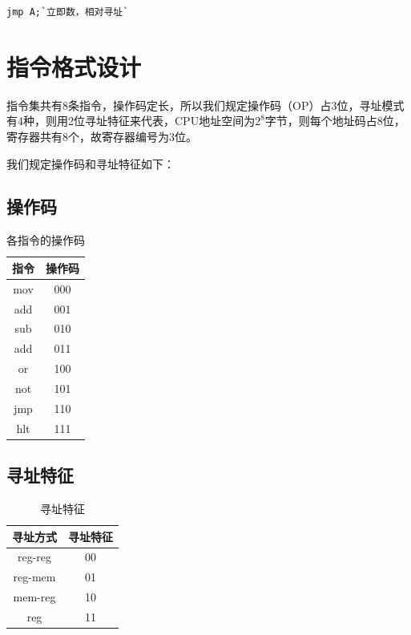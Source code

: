 \documentclass[UTF8]{ctexrep}
\begin{document}
\begin{lstlisting}[language={[x86masm]Assembler}]
jmp A;`立即数，相对寻址`
\end{lstlisting}

\chapter{指令格式设计}

指令集共有8条指令，操作码定长，所以我们规定操作码（OP）占3位，寻址模式有4种，则用2位寻址特征来代表，CPU地址空间为$2^8$字节，则每个地址码占8位，寄存器共有8个，故寄存器编号为3位。

我们规定操作码和寻址特征如下：

\section{操作码}

\begin{table}[H]
\centering
\begin{tabular}{|c|c|}
\hline
指令  & 操作码 \\ \hline
mov & 000 \\ \hline
add & 001 \\ \hline
sub & 010 \\ \hline
add & 011 \\ \hline
or  & 100 \\ \hline
not & 101 \\ \hline
jmp & 110 \\ \hline
hlt & 111 \\ \hline
\end{tabular}
\caption{各指令的操作码}
\label{tab:1}
\end{table}

\section{寻址特征}

\begin{table}[H]
\centering
\begin{tabular}{|c|c|}
\hline
寻址方式    & 寻址特征 \\ \hline
reg-reg & 00   \\ \hline
reg-mem & 01   \\ \hline
mem-reg & 10   \\ \hline
reg     & 11   \\ \hline
\end{tabular}
\caption{寻址特征}
\label{tab:2}
\end{table}
\end{document}
